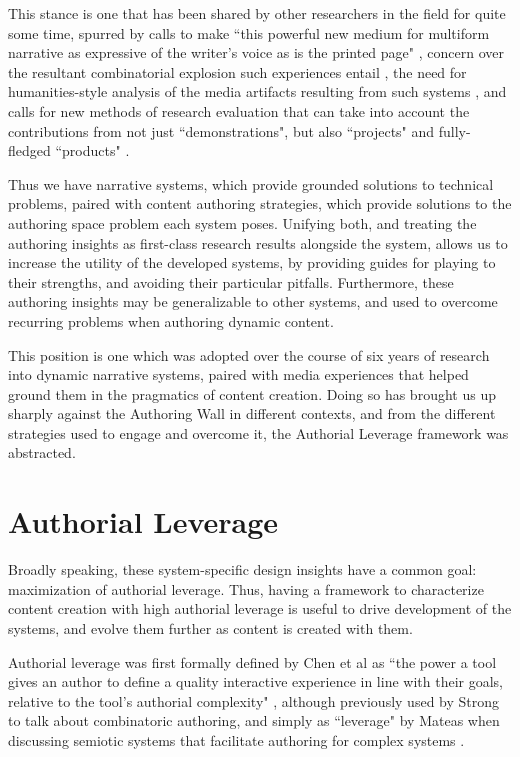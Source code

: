 This stance is one that has been shared by other researchers in the field for quite some time, spurred by calls to make ``this powerful new medium for multiform narrative as expressive of the writer’s voice as is the printed page" \cite[250]{hamlet_holodeck}, concern over the resultant combinatorial explosion such experiences entail \cite{combo_stern}, the need for humanities-style analysis of the media artifacts resulting from such systems \cite{koenitz_five_theses}, and calls for new methods of research evaluation that can take into account the contributions from not just ``demonstrations", but also ``projects" and fully-fledged ``products" \cite[63-64]{wardrip2014envisioning}.

Thus we have narrative systems, which provide grounded solutions to technical problems, paired with content authoring strategies, which provide solutions to the authoring space problem each system poses. Unifying both, and treating the authoring insights as first-class research results alongside the system, allows us to increase the utility of the developed systems, by providing guides for playing to their strengths, and avoiding their particular pitfalls. Furthermore, these authoring insights may be generalizable to other systems, and used to overcome recurring problems when authoring dynamic content.

This position is one which was adopted over the course of six years of research into dynamic narrative systems, paired with media experiences that helped ground them in the pragmatics of content creation. Doing so has brought us up sharply against the Authoring Wall in different contexts, and from the different strategies used to engage and overcome it, the Authorial Leverage framework was abstracted.

\section*{Authorial Leverage}

Broadly speaking, these system-specific design insights have a common goal: maximization of authorial leverage. Thus, having a framework to characterize content creation with high authorial leverage is useful to drive development of the systems, and evolve them further as content is created with them.

Authorial leverage was first formally defined by Chen et al as ``the power a tool gives an author to define a quality interactive experience in line with their goals, relative to the tool’s authorial complexity" \cite{chen2009evaluating}, although previously used by Strong \cite{strong2008talking} to talk about combinatoric authoring, and simply as ``leverage" by Mateas when discussing semiotic systems that facilitate authoring for complex systems \cite{mateas2003expressive}.

